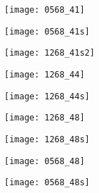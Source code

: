 \texttt{[image: 0568\_41]}

\texttt{[image: 0568\_41s]}

\texttt{[image: 1268\_41s2]}

\texttt{[image: 1268\_44]}

\texttt{[image: 1268\_44s]}


\texttt{[image: 1268\_48]}

\texttt{[image: 1268\_48s]}

\texttt{[image: 0568\_48]}

\texttt{[image: 0568\_48s]}





%


%

% 
%
%
%
%
%
%